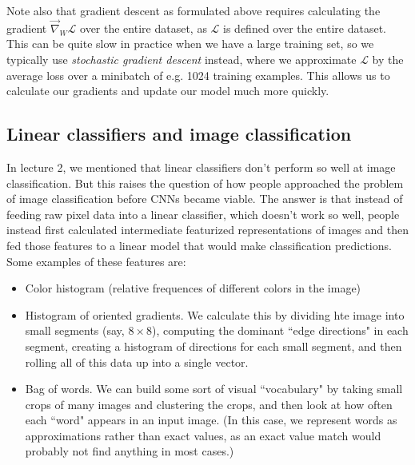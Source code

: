 Note also that gradient descent as formulated above requires calculating the gradient $\overrightarrow{\nabla}_W\mathcal{L}$ over the entire dataset, as $\mathcal{L}$ is defined over the entire dataset. This can be quite slow in practice when we have a large training set, so we typically use \emph{stochastic gradient descent} instead, where we approximate $\mathcal{L}$ by the average loss over a minibatch of e.g. 1024 training examples. This allows us to calculate our gradients and update our model much more quickly.

\subsection{Linear classifiers and image classification}
In lecture 2, we mentioned that linear classifiers don't perform so well at image classification. But this raises the question of how people approached the problem of image classification before CNNs became viable. The answer is that instead of feeding raw pixel data into a linear classifier, which doesn't work so well, people instead first calculated intermediate featurized representations of images and then fed those features to a linear model that would make classification predictions. Some examples of these features are:
\begin{itemize}
\item Color histogram (relative frequences of different colors in the image)
\item Histogram of oriented gradients. We calculate this by dividing hte image into small segments (say, $8 \times 8$), computing the dominant ``edge directions" in each segment, creating a histogram of directions for each small segment, and then rolling all of this data up into a single vector.
\item Bag of words. We can build some sort of visual ``vocabulary" by taking small crops of many images and clustering the crops, and then look at how often each ``word" appears in an input image. (In this case, we represent words as approximations rather than exact values, as an exact value match would probably not find anything in most cases.)
\end{itemize}
